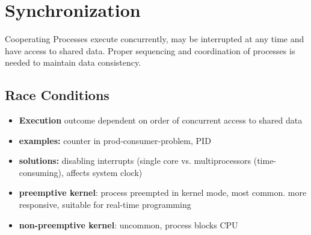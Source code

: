 \section*{Synchronization}
Cooperating Processes execute concurrently, may be interrupted at any time and have access to shared data. Proper sequencing and coordination of processes is needed to maintain data consistency.
\subsection*{Race Conditions}
\begin{itemize}
    \item \textbf{Execution} outcome dependent on order of concurrent access to shared data
        \item \textbf{examples:} counter in prod-consumer-problem, PID
        \item \textbf{solutions:} disabling interrupts (single core vs. multiprocessors (time-consuming), affects system clock)
        \item \textbf{preemptive kernel}: process preempted in kernel mode, most common. more responsive, suitable for real-time programming
    \item \textbf{non-preemptive kernel}: uncommon, process blocks CPU
\end{itemize}
